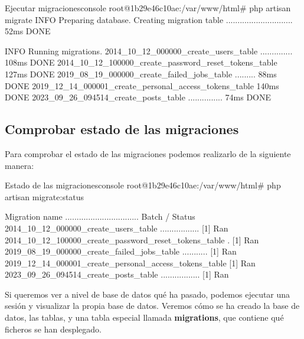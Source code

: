 \begin{mycode}{Ejecutar migraciones}{console}{}
root@1b29e46c10ae:/var/www/html# php artisan migrate
   INFO  Preparing database.
Creating migration table ............................. 52ms DONE

   INFO  Running migrations.
2014_10_12_000000_create_users_table ..............   108ms DONE
2014_10_12_100000_create_password_reset_tokens_table  127ms DONE
2019_08_19_000000_create_failed_jobs_table .........   88ms DONE
2019_12_14_000001_create_personal_access_tokens_table 140ms DONE
2023_09_26_094514_create_posts_table ...............   74ms DONE
\end{mycode}

\subsection{Comprobar estado de las migraciones}

Para comprobar el estado de las migraciones podemos realizarlo de la siguiente manera:
\begin{mycode}{Estado de las migraciones}{console}{}
root@1b29e46c10ae:/var/www/html# php artisan migrate:status

Migration name ................................ Batch / Status
2014_10_12_000000_create_users_table ................. [1] Ran
2014_10_12_100000_create_password_reset_tokens_table . [1] Ran
2019_08_19_000000_create_failed_jobs_table ........... [1] Ran
2019_12_14_000001_create_personal_access_tokens_table  [1] Ran
2023_09_26_094514_create_posts_table ................. [1] Ran
\end{mycode}


Si queremos ver a nivel de base de datos qué ha pasado, podemos ejecutar una sesión y visualizar la propia base de datos. Veremos cómo se ha creado la base de datos, las tablas, y una tabla especial llamada \textbf{migrations}, que contiene qué ficheros se han desplegado.

